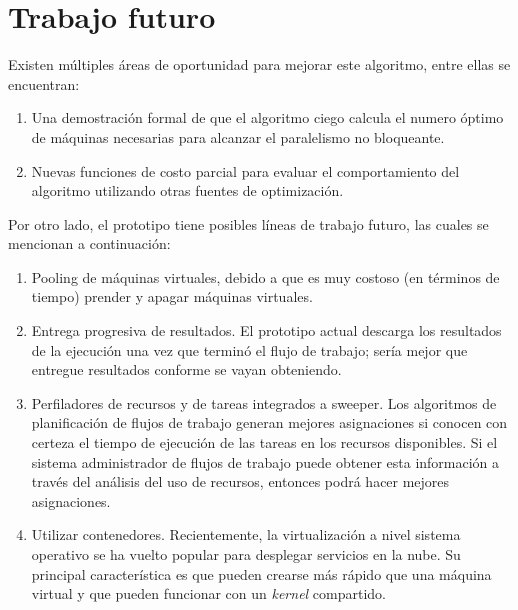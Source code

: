 \section{Trabajo futuro}

Existen múltiples áreas de oportunidad para mejorar este algoritmo, entre ellas se encuentran:

\begin{enumerate}
\item{Una demostraci\'on formal de que el algoritmo ciego calcula el numero \'optimo de m\'aquinas necesarias para alcanzar el paralelismo no bloqueante.}
\item{Nuevas funciones de costo parcial para evaluar el comportamiento del algoritmo utilizando otras fuentes de optimizaci\'on.}
\end{enumerate}

Por otro lado, el prototipo tiene posibles l\'ineas de trabajo futuro, las cuales se mencionan a continuaci\'on:

\begin{enumerate}
\item{Pooling de m\'aquinas virtuales, debido a que es muy costoso (en t\'erminos de tiempo) prender y apagar m\'aquinas virtuales.}
\item{Entrega progresiva de resultados. El prototipo actual descarga los resultados de la ejecuci\'on una vez que termin\'o el flujo de trabajo; ser\'ia mejor que entregue resultados conforme se vayan obteniendo.}
\item{Perfiladores de recursos y de tareas integrados a sweeper. Los algoritmos de planificación de flujos de trabajo generan mejores asignaciones si conocen con certeza el tiempo de ejecución de las tareas en los recursos disponibles. Si el sistema administrador de flujos de trabajo puede obtener esta información a través del análisis del uso de recursos, entonces podrá hacer mejores asignaciones.}
\item{Utilizar contenedores. Recientemente, la virtualizaci\'on a nivel sistema operativo se ha vuelto popular para desplegar servicios en la nube. Su principal caracter\'istica es que pueden crearse m\'as r\'apido que una m\'aquina virtual y que pueden funcionar con un \emph{kernel} compartido.}
\end{enumerate}
